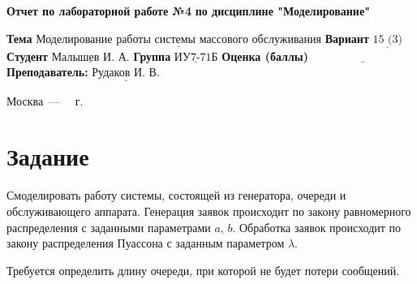 \documentclass[14pt]{extreport}
\begin{document}
\begin{titlepage}
		
		\begin{center}
			\noindent\begin{minipage}{1.3\textwidth}\centering
				\Large\textbf{  Отчет по лабораторной работе №4}\newline
				\textbf{по дисциплине \newline "Моделирование"}\newline\newline
			\end{minipage}
		\end{center}
		
		\noindent\textbf{Тема} $\underline{\text{Моделирование работы системы массового обслуживания}}$\newline\newline
		\noindent\textbf{Вариант} $\underline{\text{15 (3)}}$\newline\newline
		\noindent\textbf{Студент} $\underline{\text{Малышев И. А.}}$\newline\newline
		\noindent\textbf{Группа} $\underline{\text{ИУ7-71Б}}$\newline\newline
		\noindent\textbf{Оценка (баллы)} $\underline{\text{~~~~~~~~~~~~~~~~~~~~~~~~~~~}}$\newline\newline
		\noindent\textbf{Преподаватель: } $\underline{\text{Рудаков И. В.}}$\newline\newline\newline
		
		\begin{center}
			\vfill
			Москва~---~\the\year
			~г.
		\end{center}
	\end{titlepage}
	
	
	\setcounter{page}{2}

\chapter{Задание}

Смоделировать работу системы, состоящей из генератора, очереди и обслуживающего аппарата. Генерация заявок происходит по закону равномерного распределения с заданными параметрами $a$, $b$. Обработка заявок происходит по закону распределения Пуассона с заданным параметром $\lambda$.

Требуется определить длину очереди, при которой не будет потери сообщений.
\end{document}
